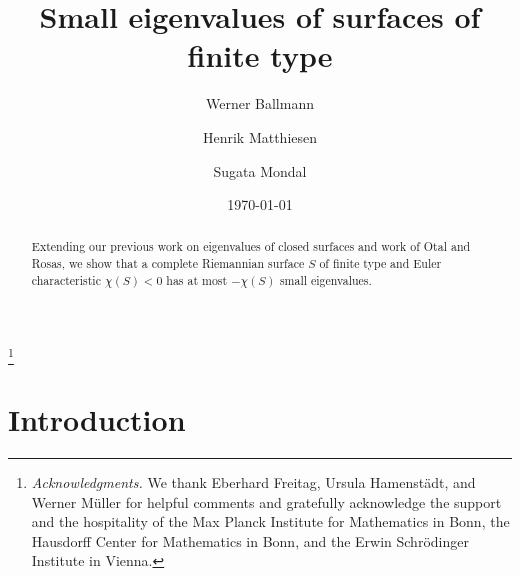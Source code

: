 
\usepackage{amssymb}
\usepackage[alwaysadjust]{paralist}
\usepackage[capitalize]{cleveref}
\newtheorem{claim}[equation]{Claim}
\newtheorem{cor}[equation]{Corollary}
\newtheorem{lem}[equation]{Lemma}
\newtheorem{prop}[equation]{Proposition}
\newtheorem{thm}[equation]{Theorem}
\theoremstyle{definition}
\newtheorem{defn}[equation]{Definition}
\newtheorem{exa}[equation]{Example}
\newtheorem{exas}[equation]{Examples}
\newtheorem{rem}[equation]{Remark}
\newtheorem{rems}[equation]{Remarks}



\title{Small eigenvalues of surfaces of finite type}
\author{Werner Ballmann}
\address
{Max Planck Institute for Mathematics,
Vivatsgasse 7, D--53111 Bonn\\}
\author{Henrik Matthiesen}
\address
{Max Planck Institute for Mathematics,
Vivatsgasse 7, D--53111 Bonn\\}
\author{Sugata Mondal}
\address{Max Planck Institute for Mathematics,
Vivatsgasse 7, D--53111 Bonn\\}

\thanks{\emph{Acknowledgments.}
We thank Eberhard Freitag, Ursula Hamenst\"adt, and Werner M\"uller
for helpful comments
and gratefully acknowledge the support and the hospitality of the Max Planck
Institute for Mathematics in Bonn, the Hausdorff Center for Mathematics in Bonn,
and the Erwin Schr\"o\-dinger Institute in Vienna.}

\date{\today}


\begin{abstract}
Extending our previous work on eigenvalues of closed surfaces
and work of Otal and Rosas,
we show that a complete Riemannian surface $S$ of finite type
and Euler characteristic $\chi(S)<0$
has at most $-\chi(S)$ small eigenvalues.
\end{abstract}

\maketitle

\section{Introduction}
\label{intro}

